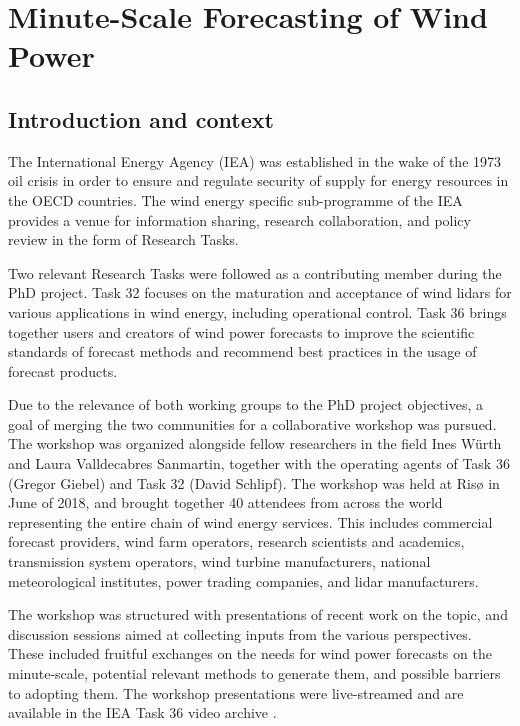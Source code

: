 \chapter{Minute-Scale Forecasting of Wind Power}


\clearpage
\section{Introduction and context}

The International Energy Agency (IEA) was established in the wake of the 1973 oil crisis in order to ensure and regulate security of supply for energy resources in the OECD countries. The wind energy specific sub-programme of the IEA provides a venue for information sharing, research collaboration, and policy review in the form of Research Tasks.

Two relevant Research Tasks were followed as a contributing member during the PhD project.  Task 32 focuses on the maturation and acceptance of wind lidars for various applications in wind energy, including operational control. Task 36 brings together users and creators of wind power forecasts to improve the scientific standards of forecast methods and recommend best practices in the usage of forecast products.

Due to the relevance of both working groups to the PhD project objectives, a goal of merging the two communities for a collaborative workshop was pursued. The workshop was organized alongside fellow researchers in the field Ines W\"urth and Laura Valldecabres Sanmartin, together with the operating agents of Task 36 (Gregor Giebel) and Task 32 (David Schlipf).
The workshop was held at Ris{\o} in June of 2018, and brought together 40 attendees from across the world representing the entire chain of wind energy services.  This includes commercial forecast providers, wind farm operators, research scientists and academics, transmission system operators, wind turbine manufacturers, national meteorological institutes, power trading companies, and lidar manufacturers. 

The workshop was structured with presentations of recent work on the topic, and discussion sessions aimed at collecting inputs from the various perspectives. These included fruitful exchanges on the needs for wind power forecasts on the minute-scale, potential relevant methods to generate them, and possible barriers to adopting them. The workshop presentations were live-streamed and are available in the IEA Task 36 video archive \cite{iea_36_youtube}.

